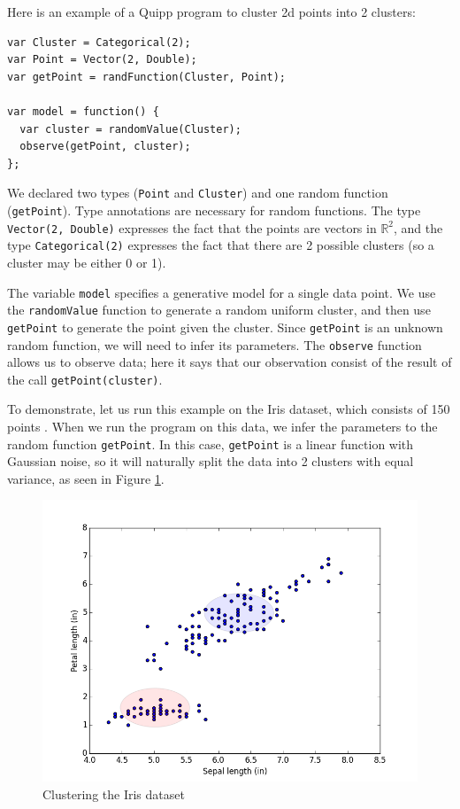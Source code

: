 \documentclass{article}
\begin{document}
  Here is an example of a Quipp program to cluster 2d points into 2 clusters:

  {
  \begin{lstlisting}
var Cluster = Categorical(2);
var Point = Vector(2, Double);
var getPoint = randFunction(Cluster, Point);

var model = function() {
  var cluster = randomValue(Cluster);
  observe(getPoint, cluster);
};
  \end{lstlisting}
}

  We declared two types (\texttt{Point} and \texttt{Cluster}) and one
  random function (\texttt{getPoint}).  Type annotations are necessary for random
  functions.  The type \texttt{Vector(2, Double)} expresses the fact that the
  points are vectors in $\mathbb{R}^2$, and the type \texttt{Categorical(2)} expresses the
  fact that there are 2 possible clusters (so a cluster may be either 0 or 1).

  The variable \texttt{model} specifies a generative model for a single data point.
  We use the \texttt{randomValue} function to generate a random uniform cluster, and then
  use \texttt{getPoint} to generate the point given the cluster.  Since \texttt{getPoint}
  is an unknown random function, we will need to infer its parameters.
  The \texttt{observe} function allows us to observe data; here it says that our
  observation consist of the result of the call \texttt{getPoint(cluster)}.

  To demonstrate, let us run this example on the Iris dataset, which consists of 150 points \cite{Lichman:2013}.  When we run the program on this data, we infer the parameters to the random function \texttt{getPoint}.
  In this case, \texttt{getPoint} is a linear function with Gaussian noise, so it will naturally
  split the data into 2 clusters with equal variance, as seen in Figure \ref{iris-orig}.

  \begin{figure}[h]
  \begin{center}
    \includegraphics[scale=0.5]{../plots/irisclusters_orig.png}
  \end{center}
  \caption{Clustering the Iris dataset}
  \label{iris-orig}
\end{figure}
\end{document}
